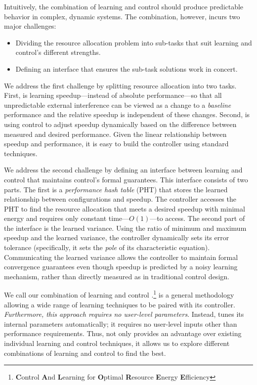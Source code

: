 Intuitively, the combination of learning and control should produce
predictable behavior in complex, dynamic systems.  The combination,
however, incurs two major challenges:
\begin{itemize}[leftmargin=1em]
\item Dividing the resource allocation problem into sub-tasks that
  suit learning and control's different strengths.
\item Defining an interface that ensures the sub-task solutions work
  in concert.
\end{itemize}

We address the first challenge by splitting resource allocation into
two tasks.  First, is learning speedup---instead of absolute
performance---so that all unpredictable external interference can be
viewed as a change to a \emph{baseline} performance and the relative
speedup is independent of these changes.    Second, is
using control to adjust speedup dynamically based on the difference
between measured and desired performance. Given the linear
relationship between speedup and performance, it is easy to build the
controller using standard techniques. 

We address the second challenge by defining an interface between
learning and control that maintains control's formal guarantees.  This
interface consists of two parts.  The first is a \emph{performance
  hash table} (PHT) that stores the learned relationship between
configurations and speedup.  The controller accesses the PHT to find
the resource allocation that meets a desired speedup with minimal
energy and requires only constant time---$O(1)$---to access.  The
second part of the interface is the learned variance.  Using the ratio
of minimum and maximum speedup and the learned variance, the
controller dynamically sets its error tolerance (specifically, it sets
the \emph{pole} of its characteristic equation).  Communicating the
learned variance allows the controller to maintain formal convergence
guarantees even though speedup is predicted by a noisy learning
mechanism, rather than directly measured as in traditional control
design.

We call our combination of learning and control
\SYSTEM{}.\footnote{\textbf{C}ontrol \textbf{A}nd \textbf{L}earning
  for \textbf{O}ptimal \textbf{R}esource \textbf{E}nergy
  \textbf{E}fficiency} \SYSTEM{} is a general methodology allowing a
wide range of learning techniques to be paired with its controller.
\emph{Furthermore, this approach requires no user-level parameters}.
Instead, \SYSTEM{} tunes its internal parameters automatically; \ie{}
it requires no user-level inputs other than performance requirements.
Thus, \SYSTEM{} not only provides an advantage over existing individual
learning and control techniques, it allows us to explore different
combinations of learning and control to find the best.

